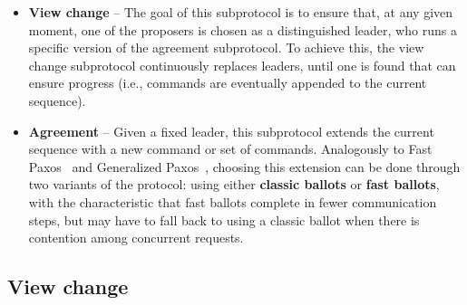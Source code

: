 \begin{itemize}

\item
  {\bf View change} -- The goal of this subprotocol is to ensure that, at any given moment, one of the proposers is chosen as a distinguished leader, who runs a specific version of the agreement subprotocol. To achieve this, the view change subprotocol continuously replaces leaders, until one is found that can ensure progress (i.e., commands are eventually appended to the current sequence).

\item
{\bf Agreement} -- Given a fixed leader, this subprotocol extends the current sequence with a new command or set of commands. Analogously to Fast Paxos~\cite{L06} and Generalized Paxos~\cite{Lamport2005}, choosing this extension can be done through two variants of the protocol: using either {\bf classic ballots} or {\bf fast ballots}, with the characteristic that fast ballots complete in fewer communication steps, but may have to fall back to using a classic ballot when there is contention among concurrent requests.

\end{itemize}

\subsection{View change} 

